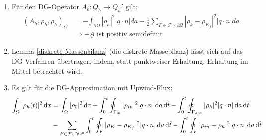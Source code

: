 \begin{remark}
	\begin{enumerate} 
		\item Für den DG-Operator $A_h: Q_h \rightarrow Q_h'$ gilt: 	\newline
		\begin{align*}
			(A_h,\rho_h,\rho_h)_{\Omega} &= - \int_{\partial 	\Omega} | \rho_h | ^2 | q \cdot n | da - \frac{1}{2} \sum_{F 	\in \mathcal{F} \backslash \partial \Omega} | \rho_k - 	\rho_{K_f} |^2 |q \cdot n| da \\
			&\Rightarrow - \underline{A} \text{ ist positiv 	semidefinit}
		\end{align*}
		\item Lemma \ref{diskrete Massenbilanz} (die diskrete Massebilanz) lässt sich auf das DG-Verfahren übertragen, indem, statt punktweiser Erhaltung, Erhaltung im Mittel betrachtet wird.
		\item Es gilt für die DG-Approximation mit Upwind-Flux: \newline
		\begin{align*}
			\int_{\Omega} | \rho_h (t) | ^2 \diff x &= \int_{\Omega} |\rho_0 |^2 \diff x 
			+ \int_0^t \oint_{\Gammain} | \rho_{in} |^2 |q \cdot n | \diff a \diff \tilde{t}
			- \int_0^t \oint_{\Gamma_{out}} |\rho_h |^2 |q \cdot n | \diff a \diff \tilde{t} \\
			&- \sum_{F \in \mathcal{F}_h \cap \Omega^0} \int_0^t \oint_F | \rho_K - \rho_{K_f} |^2 |q \cdot n| \diff a \diff \tilde{t}
			- \int_0^t \oint_F |\rho_{in} - \rho_h |^2 |q \cdot n| \diff a \diff \tilde{t}
		\end{align*}
	\end{enumerate}
\end{remark}